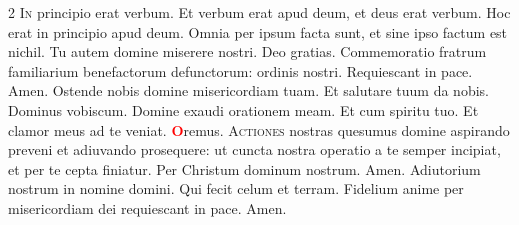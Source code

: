 \begin{multicols}{2}
\lettrine[lines=2]{\zallmancaps \color{Red} I}{n} principio erat verbum. Et verbum erat apud deum, et deus erat verbum. Hoc erat in principio apud deum. Omnia per ipsum facta sunt, et sine ipso factum est nichil. Tu autem domine miserere nostri. \R Deo gratias.
\newline {} Commemoratio fratrum familiarium benefactorum defunctorum: ordinis nostri.  Requiescant in pace. Amen. 
\newline \V Ostende nobis domine misericordiam tuam. \R Et salutare tuum da nobis.
\newline Dominus vobiscum.  Domine exaudi orationem meam.
\newline \R Et cum spiritu tuo.  Et clamor meus ad te veniat.
\newline \textcolor{Red}{\bfseries O}remus. 
\lettrine[lines=2]{\zallmancaps \color{Red} A}{ctiones} nostras quesumus domine aspirando preveni et adiuvando prosequere: ut cuncta nostra operatio a te semper incipiat, et per te cepta finiatur. Per Christum dominum nostrum. Amen.  Adiutorium nostrum in nomine domini. \R Qui fecit celum et terram.
\newline {}
\newline Fidelium anime per misericordiam dei requiescant in pace. \R Amen.
\newline {}




\end{multicols}
